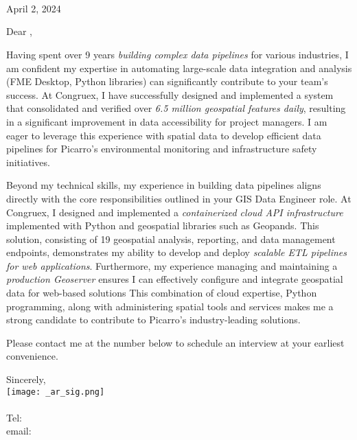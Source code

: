 \documentclass[letterpaper]{article}
\begin{document}
\large
\JobManager \\
\JobManagerTitle \\
\textbf{\JobCompany} \\

\null\hfill April 2, 2024

Dear \JobManagerShort,

Having spent over 9 years \emph{building complex data pipelines} for various
industries, I am confident my expertise in automating large-scale data
integration and analysis (FME Desktop, Python libraries) can significantly
contribute to your team's success.  At Congruex, I have
successfully designed and implemented a system that consolidated and verified over 
\emph{6.5 million geospatial features daily}, 
resulting in a significant improvement
in data accessibility for project managers.  
I am eager to leverage this experience with spatial data to develop
efficient data pipelines for Picarro's environmental
monitoring and infrastructure safety initiatives.


Beyond my technical skills, my experience in building data pipelines aligns
directly with the core responsibilities outlined in your GIS Data Engineer role.
At Congruex, I designed and implemented a \emph{containerized cloud API
infrastructure} implemented with Python and geospatial libraries such as Geopands.
This solution,
consisting of 19 geospatial analysis, reporting, and data management endpoints,
demonstrates my ability to develop and deploy 
\emph{scalable ETL pipelines for web applications}.  
Furthermore, my experience managing and maintaining a 
\emph{production Geoserver} ensures I can effectively configure and integrate geospatial
data for web-based solutions
This combination of cloud expertise, Python programming, along with 
administering spatial tools and services makes me a strong candidate to contribute to
Picarro's industry-leading solutions.

Please contact me at the number below to schedule an interview at your earliest convenience.

Sincerely,\\
    \hspace{1em}
    \texttt{[image: \_ar\_sig.png]} \\
    \CVsigname \\
    \small
    Tel: \CVphone \\
    email: \CVemail
\end{document}
